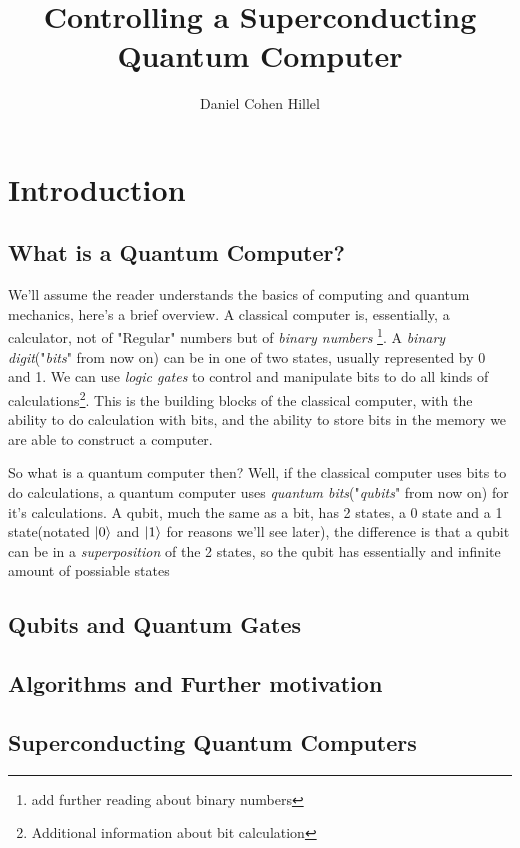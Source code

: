 \documentclass{article}
\title{Controlling a Superconducting Quantum Computer}
\author{Daniel Cohen Hillel}
\date{}
\begin{document}
\maketitle

\newpage

\tableofcontents

\newpage

\section{Introduction}

\subsection{What is a Quantum Computer?}
We'll assume the reader understands the basics of computing and quantum mechanics, here's a brief overview. \newline
 A classical computer is, essentially, a calculator, not of "Regular" numbers but of \textit{binary numbers} \footnote{ add further reading about binary numbers}. A \textit{binary digit}("\textit{bits}" from now on) can be in one of two states, usually represented by 0 and 1. We can use \textit{logic gates} to control and manipulate bits to do all kinds of calculations\footnote{Additional information about bit calculation}. This is the building blocks of the classical computer, with the ability to do calculation with bits, and the ability to store bits in the memory we are able to construct a computer.\newline \par
So what is a quantum computer then? Well, if the classical computer uses bits to do calculations, a quantum computer uses \textit{quantum bits}("\textit{qubits}" from now on) for it's calculations. A qubit, much the same as a bit, has 2 states, a 0 state and a 1 state(notated $\ket{0}$ and $\ket{1}$ for reasons we'll see later), the difference is that a qubit can be in a \textit{superposition} of the 2 states, so the qubit has essentially and infinite amount of possiable states

\subsection{Qubits and Quantum Gates}

\subsection{Algorithms and Further motivation}

\subsection{Superconducting Quantum Computers}

\newpage
\end{document}
